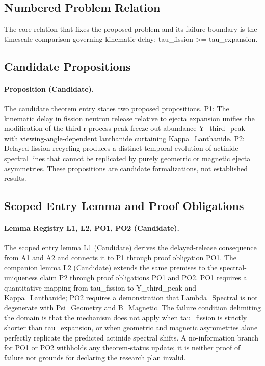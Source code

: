 \documentclass[conference]{IEEEtran}
\begin{document}
\subsection{Numbered Problem Relation}
The core relation that fixes the proposed problem and its failure boundary is the timescale comparison governing kinematic delay: tau\_fission >= tau\_expansion.

\subsection{Candidate Propositions}
\paragraph{Proposition (Candidate).} The candidate theorem entry states two proposed propositions. P1: The kinematic delay in fission neutron release relative to ejecta expansion unifies the modification of the third r-process peak freeze-out abundance Y\_third\_peak with viewing-angle-dependent lanthanide curtaining Kappa\_Lanthanide. P2: Delayed fission recycling produces a distinct temporal evolution of actinide spectral lines that cannot be replicated by purely geometric or magnetic ejecta asymmetries. These propositions are candidate formalizations, not established results.

\subsection{Scoped Entry Lemma and Proof Obligations}
\paragraph{Lemma Registry L1, L2, PO1, PO2 (Candidate).} The scoped entry lemma L1 (Candidate) derives the delayed-release consequence from A1 and A2 and connects it to P1 through proof obligation PO1. The companion lemma L2 (Candidate) extends the same premises to the spectral-uniqueness claim P2 through proof obligations PO1 and PO2. PO1 requires a quantitative mapping from tau\_fission to Y\_third\_peak and Kappa\_Lanthanide; PO2 requires a demonstration that Lambda\_Spectral is not degenerate with Psi\_Geometry and B\_Magnetic. The failure condition delimiting the domain is that the mechanism does not apply when tau\_fission is strictly shorter than tau\_expansion, or when geometric and magnetic asymmetries alone perfectly replicate the predicted actinide spectral shifts. A no-information branch for PO1 or PO2 withholds any theorem-status update; it is neither proof of failure nor grounds for declaring the research plan invalid.
\end{document}
